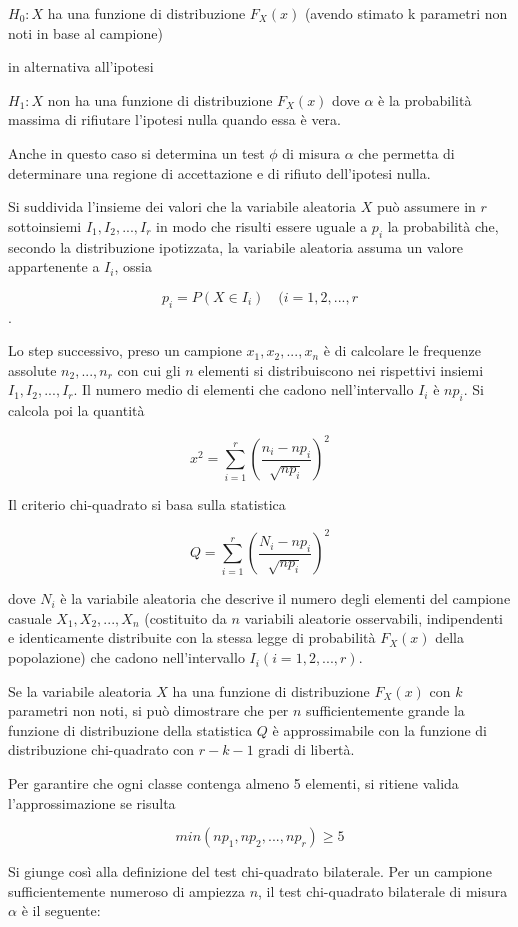 $H_0:X$ ha una funzione di distribuzione $F_X(x)$ (avendo stimato k parametri non noti in base al campione) 

in alternativa all'ipotesi

$H_1:X$ non ha una funzione di distribuzione $F_X(x)$ dove $\alpha$ è la probabilità massima di rifiutare l'ipotesi nulla quando essa è vera.

Anche in questo caso si determina un test $\phi$ di misura $\alpha$ che permetta di determinare una regione di accettazione e di rifiuto dell'ipotesi nulla. 

Si suddivida l'insieme dei valori che la variabile aleatoria $X$ può assumere in $r$ sottoinsiemi $I_1, I_2, ..., I_r$ in modo che risulti essere uguale a $p_i$ la probabilità che, secondo la distribuzione ipotizzata, la variabile aleatoria assuma un valore appartenente a $I_i$, ossia

\[p_i = P(X \in I_i) \quad (i=1,2,...,r\].

Lo step successivo, preso un campione $x_1, x_2, ..., x_n$ è di calcolare le frequenze assolute $n_2, ..., n_r$ con cui gli $n$ elementi si distribuiscono nei rispettivi insiemi $I_1, I_2, ..., I_r$. Il numero medio di elementi che cadono nell'intervallo $I_i$ è $np_i$. Si calcola poi la quantità

\[x^2 = \sum_{i=1}^r(\frac{n_i - np_i}{\sqrt{np_i}})^2\]

Il criterio chi-quadrato si basa sulla statistica

\[Q = \sum_{i=1}^r(\frac{N_i - np_i}{\sqrt{np_i}})^2\]

dove $N_i$ è la variabile aleatoria che descrive il numero degli elementi del campione casuale $X_1, X_2, ..., X_n$ (costituito da $n$ variabili  aleatorie osservabili, indipendenti e identicamente distribuite con la stessa legge di probabilità $F_X(x)$ della popolazione) che cadono nell'intervallo $I_i(i=1,2,...,r)$.

Se la variabile aleatoria $X$ ha una funzione di distribuzione $F_X(x)$ con $k$ parametri non noti, si può dimostrare che per $n$ sufficientemente grande la funzione di distribuzione della statistica $Q$ è approssimabile con la funzione di distribuzione chi-quadrato con $r-k-1$ gradi di libertà.

Per garantire che ogni classe contenga almeno 5 elementi, si ritiene valida l'approssimazione se risulta 

\[min(np_1, np_2, ..., np_r) \geq 5\]

Si giunge così alla definizione del test chi-quadrato bilaterale. Per un campione sufficientemente numeroso di ampiezza $n$, il test chi-quadrato bilaterale di misura $\alpha$ è il seguente:

